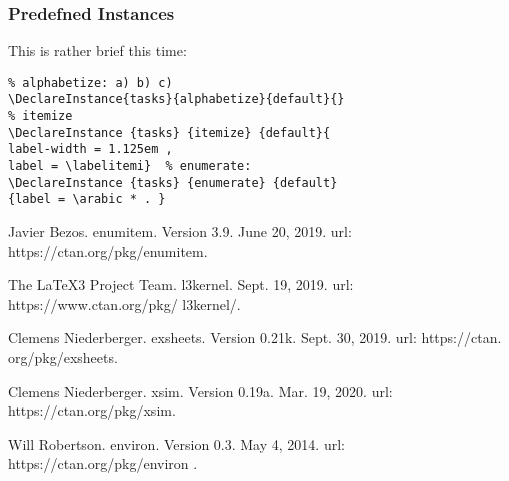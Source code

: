\documentclass[a4paper,12pt,indent]{article}
\begin{document}
\subsubsection{Predefned Instances}

This is rather brief this time:

    \begin{tcolorbox}[collower=black,colframe=Tasks,colback=white]
        \begin{lstlisting}
% alphabetize: a) b) c)
\DeclareInstance{tasks}{alphabetize}{default}{}
% itemize
\DeclareInstance {tasks} {itemize} {default}{
label-width = 1.125em ,
label = \labelitemi}  % enumerate:
\DeclareInstance {tasks} {enumerate} {default}
{label = \arabic * . }
    \end{lstlisting}
        \end{tcolorbox}

\begin{thebibliography}{9}

 Javier Bezos. enumitem. Version 3.9. June 20, 2019. url: https://ctan.org/pkg/enumitem.

 The \LaTeX{}3 Project Team. l3kernel. Sept. 19, 2019.
url: https://www.ctan.org/pkg/ l3kernel/.

 Clemens Niederberger. exsheets. Version 0.21k. Sept. 30, 2019.
url: https://ctan. org/pkg/exsheets.

 Clemens Niederberger. xsim. Version 0.19a. Mar. 19, 2020.
url: https://ctan.org/pkg/xsim.

 Will Robertson. environ. Version 0.3. May 4, 2014.
url: https://ctan.org/pkg/environ .

\end{thebibliography}
\end{document}
